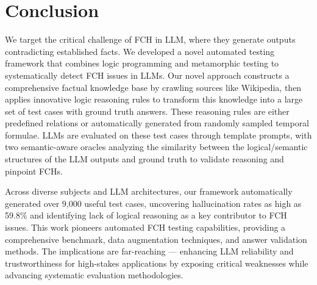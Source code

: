 \section{Conclusion}
We target the critical challenge of FCH in LLM, where they generate outputs contradicting established facts. We developed a novel automated testing framework that combines logic programming and metamorphic testing to systematically detect FCH issues in LLMs. Our novel approach constructs a comprehensive factual knowledge base by crawling sources like Wikipedia, then applies innovative logic reasoning rules to transform this knowledge into a large set of test cases with ground truth answers. 
These reasoning rules are either predefined relations or automatically generated from randomly sampled temporal formulae. 
LLMs are evaluated on these test cases through template prompts, with two semantic-aware oracles analyzing the similarity between the logical/semantic structures of the LLM outputs and ground truth to validate reasoning and pinpoint FCHs. 

Across diverse subjects and LLM architectures, our framework automatically generated over 9,000 useful test cases, uncovering hallucination rates as high as 59.8\% and identifying lack of logical reasoning as a key contributor to FCH issues. This work pioneers automated FCH testing capabilities, providing a comprehensive benchmark, data augmentation techniques, and answer validation methods. The implications are far-reaching --- enhancing LLM reliability and trustworthiness for high-stakes applications by exposing critical weaknesses while advancing systematic evaluation methodologies.
